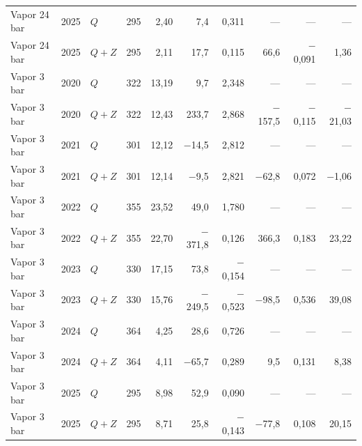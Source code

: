 {\begin{xltabular}{\linewidth}{@{}lllrrrrrrr@{}}
Vapor 24 bar & 2025 & $Q$ & 295 & 2,40 & 7,4 & 0,311 & --- & --- & --- \\
Vapor 24 bar & 2025 & $Q+Z$ & 295 & 2,11 & 17,7 & 0,115 & 66,6 & $-$0,091 & 1,36 \\
Vapor 3 bar & 2020 & $Q$ & 322 & 13,19 & 9,7 & 2,348 & --- & --- & --- \\
Vapor 3 bar & 2020 & $Q+Z$ & 322 & 12,43 & 233,7 & 2,868 & $-$157,5 & $-$0,115 & $-$21,03 \\
Vapor 3 bar & 2021 & $Q$ & 301 & 12,12 & $-$14,5 & 2,812 & --- & --- & --- \\
Vapor 3 bar & 2021 & $Q+Z$ & 301 & 12,14 & $-$9,5 & 2,821 & $-$62,8 & 0,072 & $-$1,06 \\
Vapor 3 bar & 2022 & $Q$ & 355 & 23,52 & 49,0 & 1,780 & --- & --- & --- \\
Vapor 3 bar & 2022 & $Q+Z$ & 355 & 22,70 & $-$371,8 & 0,126 & 366,3 & 0,183 & 23,22 \\
Vapor 3 bar & 2023 & $Q$ & 330 & 17,15 & 73,8 & $-$0,154 & --- & --- & --- \\
Vapor 3 bar & 2023 & $Q+Z$ & 330 & 15,76 & $-$249,5 & $-$0,523 & $-$98,5 & 0,536 & 39,08 \\
Vapor 3 bar & 2024 & $Q$ & 364 & 4,25 & 28,6 & 0,726 & --- & --- & --- \\
Vapor 3 bar & 2024 & $Q+Z$ & 364 & 4,11 & $-$65,7 & 0,289 & 9,5 & 0,131 & 8,38 \\
Vapor 3 bar & 2025 & $Q$ & 295 & 8,98 & 52,9 & 0,090 & --- & --- & --- \\
Vapor 3 bar & 2025 & $Q+Z$ & 295 & 8,71 & 25,8 & $-$0,143 & $-$77,8 & 0,108 & 20,15 \\
\end{xltabular}
}
